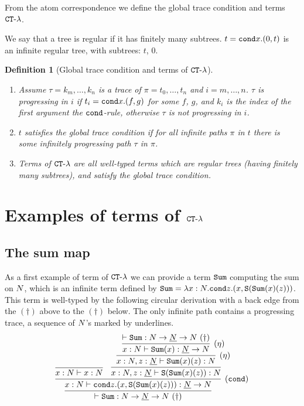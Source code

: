 \documentclass{article}
\newtheorem{definition}[theorem]{Definition}
\begin{document}
From the atom correspondence we define the global trace condition and terms ${ {\tt CT} \mbox{-} \lambda}$.

We say that a tree is regular if it has finitely many subtrees. $t={\tt cond} x.(0,t)$ is an infinite regular tree,
with subtrees: $t$, $0$.

\begin{definition}[Global trace condition and terms of ${ {\tt CT} \mbox{-} \lambda}$]
\begin{enumerate}
\item
Assume $\tau = k_m, \ldots, k_n$ is a trace of $\pi =t_0, \ldots, t_n$ and $i=m,\ldots, n$.
$\tau$ is progressing in $i$ if $t_i={\tt cond} x.(f,g)$ for some $f$, $g$,
and $k_i$ is the index of the first argument the ${\tt cond}$-rule, otherwise $\tau$ is not progressing in $i$.

\item
$t$ satisfies the global trace condition if for all infinite paths $\pi$ in $t$ 
there is some infinitely progressing path $\tau$ in $\pi$.

\item
Terms of ${ {\tt CT} \mbox{-} \lambda}$ are all well-typed terms which are regular trees (having finitely many subtrees), 
and satisfy the global trace condition.

\end{enumerate}
\end{definition}


\section{Examples of terms of ${ {\tt CT} \mbox{-} \lambda}$}

\subsection{The sum map}
As a first example of term of  ${ {\tt CT} \mbox{-} \lambda}$ we can provide a term ${\tt Sum}$ computing the sum on ${N}$,
which is an infinite term defined by ${\tt Sum} = \lambda x:{N}.{\tt cond} z.(x,{\tt S}({\tt Sum}(x)(z)))$.
This term is well-typed by the following circular derivation with a back edge from the $(\dagger)$ above to the $(\dagger)$ below.
The only infinite path contains a progressing trace, a sequence of ${N}$'s marked by underlines. 
\[
\infer{
  \vdash \Sum:\N \rightarrow \underline{\N} \rightarrow \N\ (\dagger)
}{
  \infer[(\cond)]{
    x:\N \vdash \cond z.(x,\Succ(\Sum(x)(z))): \underline{\N} \rightarrow \N
  }{
    \infer{
      x:\N \vdash x:\N
    }{}
    &
    \infer{
      x:\N,z:\underline{\N} \vdash \Succ(\Sum(x)(z)): \N
    }{
      \infer[(\eta)]{
        x:\N,z:\underline{\N} \vdash \Sum(x)(z): \N
      }{
        \infer[(\eta)]{
          x:\N \vdash \Sum(x): \underline{\N} \rightarrow \N
        }{
          \vdash \Sum: \N \rightarrow \underline{\N} \rightarrow \N\ (\dagger)
        }
      }
    }
  }
}
\]
\end{document}
